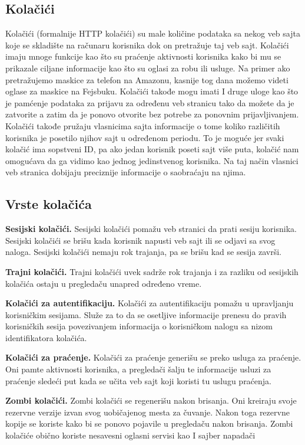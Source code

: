 \documentclass[a4paper]{article}
\begin{document}
	\subsection{Kolačići}
	\label{subsec:kolacici}
	Kolačići (formalnije HTTP kolačići) su male količine podataka sa nekog veb sajta koje se skladište na računaru korisnika dok on pretražuje taj veb sajt. Kolačići imaju mnoge funkcije kao što su praćenje aktivnosti korisnika kako bi mu se prikazale ciljane informacije kao što su oglasi za robu ili usluge. Na primer ako pretražujemo maskice za telefon na Amazonu, kasnije tog dana možemo videti oglase za maskice na Fejsbuku. Kolačići takođe mogu imati I druge uloge kao što je pamćenje podataka za prijavu za određenu veb stranicu tako da možete da je zatvorite a zatim da je ponovo otvorite bez potrebe za ponovnim prijavljivanjem. Kolačići takođe pružaju vlasnicima sajta informacije o tome koliko različitih korisnika je posetilo njihov sajt u određenom periodu. To je moguće jer svaki kolačić ima sopstveni ID, pa ako jedan korisnik poseti sajt više puta, kolačić nam omogućava da ga vidimo kao jednog jedinstvenog korisnika. Na taj način vlasnici veb stranica dobijaju preciznije informacije o saobraćaju na njima.
	
	\subsection{Vrste kolačića}
	\label{subsec:vrstekolacica}
	\textbf{Sesijski kolačići.} Sesijski kolačići pomažu veb stranici da prati sesiju korisnika. Sesijski kolačići se brišu kada korisnik napusti veb sajt ili se odjavi sa svog naloga. Sesijski kolačići nemaju rok trajanja, pa se brišu kad se sesija završi. 
	
	\textbf{Trajni kolačići.} Trajni kolačići uvek sadrže rok trajanja i za razliku od sesijskih kolačića ostaju u pregledaču unapred određeno vreme. 
	
	\textbf{Kolačići za autentifikaciju.} Kolačići za autentifikaciju pomažu u upravljanju korisničkim sesijama. Služe za to da se osetljive informacije prenesu do pravih korisničkih sesija povezivanjem informacija o korisničkom nalogu sa nizom identifikatora kolačića. 
	
	\textbf{Kolačići za praćenje.} Kolačići za praćenje generišu se preko usluga za praćenje. Oni pamte aktivnosti korisnika, a pregledači šalju te informacije usluzi za praćenje sledeći put kada se učita veb sajt koji koristi tu uslugu praćenja. 
	
	\textbf{Zombi kolačići.} Zombi kolačići se regenerišu nakon brisanja. Oni kreiraju svoje rezervne verzije izvan svog uobičajenog mesta za čuvanje. Nakon toga rezervne kopije se koriste kako bi se ponovo pojavile u pregledaču nakon brisanja. Zombi kolačiće obično koriste nesavesni oglasni servisi kao I sajber napadači 
	
\end{document}
